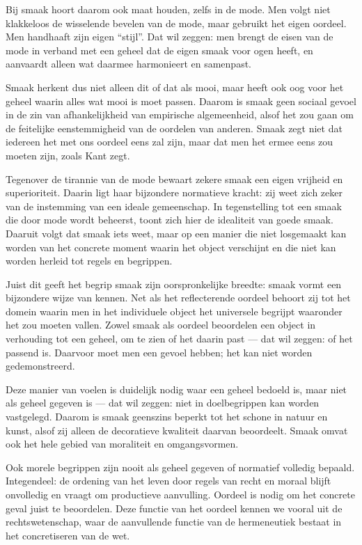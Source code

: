 Bij smaak hoort daarom ook maat houden, zelfs in de mode. Men volgt niet klakkeloos de wisselende bevelen van de mode, maar gebruikt het eigen oordeel. Men handhaaft zijn eigen ``stijl''. Dat wil zeggen: men brengt de eisen van de mode in verband met een geheel dat de eigen smaak voor ogen heeft, en aanvaardt alleen wat daarmee harmonieert en samenpast.

Smaak herkent dus niet alleen dit of dat als mooi, maar heeft ook oog voor het geheel waarin alles wat mooi is moet passen. Daarom is smaak geen sociaal gevoel in de zin van afhankelijkheid van empirische algemeenheid, alsof het zou gaan om de feitelijke eenstemmigheid van de oordelen van anderen. Smaak zegt niet dat iedereen het met ons oordeel eens zal zijn, maar dat men het ermee eens zou moeten zijn, zoals Kant zegt.

Tegenover de tirannie van de mode bewaart zekere smaak een eigen vrijheid en superioriteit. Daarin ligt haar bijzondere normatieve kracht: zij weet zich zeker van de instemming van een ideale gemeenschap. In tegenstelling tot een smaak die door mode wordt beheerst, toont zich hier de idealiteit van goede smaak. Daaruit volgt dat smaak iets weet, maar op een manier die niet losgemaakt kan worden van het concrete moment waarin het object verschijnt en die niet kan worden herleid tot regels en begrippen.

Juist dit geeft het begrip smaak zijn oorspronkelijke breedte: smaak vormt een bijzondere wijze van kennen. Net als het reflecterende oordeel behoort zij tot het domein waarin men in het individuele object het universele begrijpt waaronder het zou moeten vallen. Zowel smaak als oordeel beoordelen een object in verhouding tot een geheel, om te zien of het daarin past — dat wil zeggen: of het passend is. Daarvoor moet men een gevoel hebben; het kan niet worden gedemonstreerd.

Deze manier van voelen is duidelijk nodig waar een geheel bedoeld is, maar niet als geheel gegeven is — dat wil zeggen: niet in doelbegrippen kan worden vastgelegd. Daarom is smaak geenszins beperkt tot het schone in natuur en kunst, alsof zij alleen de decoratieve kwaliteit daarvan beoordeelt. Smaak omvat ook het hele gebied van moraliteit en omgangsvormen.

Ook morele begrippen zijn nooit als geheel gegeven of normatief volledig bepaald. Integendeel: de ordening van het leven door regels van recht en moraal blijft onvolledig en vraagt om productieve aanvulling. Oordeel is nodig om het concrete geval juist te beoordelen. Deze functie van het oordeel kennen we vooral uit de rechtswetenschap, waar de aanvullende functie van de hermeneutiek bestaat in het concretiseren van de wet.

